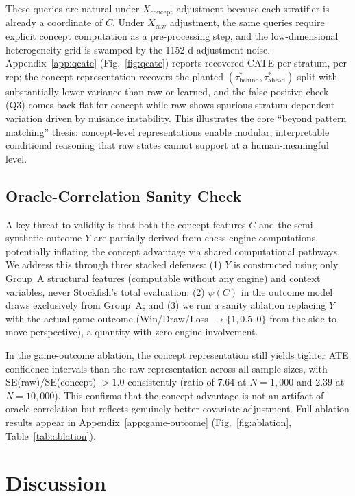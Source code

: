 \documentclass{article}
\begin{document}
These queries are natural under $X_{\text{concept}}$ adjustment because each
stratifier is already a coordinate of $C$. Under $X_{\text{raw}}$ adjustment, the
same queries require explicit concept computation as a pre-processing step, and the
low-dimensional heterogeneity grid is swamped by the 1152-d adjustment noise.
Appendix~\ref{app:qcate} (Fig.~\ref{fig:qcate}) reports recovered CATE per stratum, per rep; the concept
representation recovers the planted $(\tau^*_{\text{behind}}, \tau^*_{\text{ahead}})$
split with substantially lower variance than raw or learned, and the false-positive
check (Q3) comes back flat for concept while raw shows spurious
stratum-dependent variation driven by nuisance instability.
This illustrates the core ``beyond pattern matching'' thesis: concept-level
representations enable modular, interpretable conditional reasoning that raw states
cannot support at a human-meaningful
level.\cite{lemeire2005causalmodelsinchess,scholkopf2021towards}

\subsection{Oracle-Correlation Sanity Check}
A key threat to validity is that both the concept features $C$ and the
semi-synthetic outcome $Y$ are partially derived from chess-engine computations,
potentially inflating the concept advantage via shared computational pathways. We
address this through three stacked defenses: (1) $Y$ is constructed using only
Group~A structural features (computable without any engine) and context variables,
never Stockfish's total evaluation; (2) $\psi(C)$ in the outcome model draws
exclusively from Group~A; and (3) we run a sanity ablation replacing $Y$ with the
actual game outcome (Win/Draw/Loss $\to \{1, 0.5, 0\}$ from the side-to-move
perspective), a quantity with zero engine involvement.

In the game-outcome ablation, the concept representation still yields tighter ATE
confidence intervals than the raw representation across all sample sizes, with
SE(raw)/SE(concept) $> 1.0$ consistently (ratio of $7.64$ at $N{=}1{,}000$
and $2.39$ at $N{=}10{,}000$). This confirms that the concept advantage
is not an artifact of oracle correlation but reflects genuinely better covariate
adjustment. Full ablation results appear in Appendix~\ref{app:game-outcome}
(Fig.~\ref{fig:ablation}, Table~\ref{tab:ablation}).

\section{Discussion}
\end{document}
